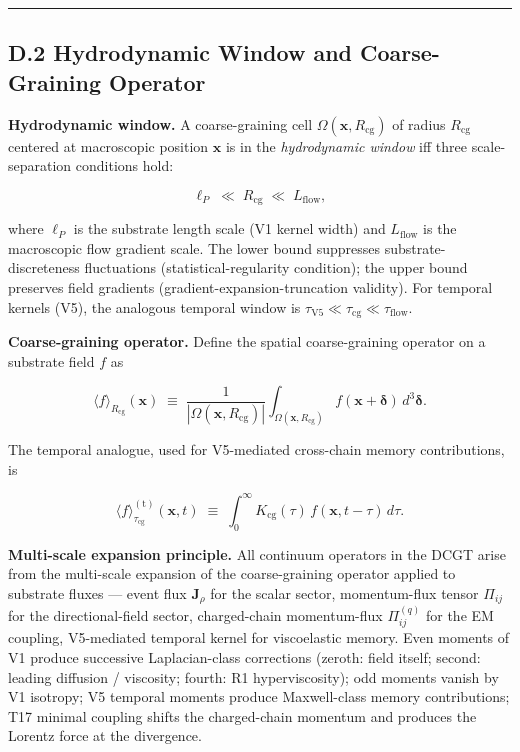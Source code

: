 \documentclass[
  11pt,a4paper]{article}
\begin{document}
\begin{center}\rule{0.5\linewidth}{0.5pt}\end{center}

\subsection{D.2 Hydrodynamic Window and Coarse-Graining
Operator}\label{d.2-hydrodynamic-window-and-coarse-graining-operator}

\textbf{Hydrodynamic window.} A coarse-graining cell
\(\Omega(\mathbf{x},R_\mathrm{cg})\) of radius \(R_\mathrm{cg}\)
centered at macroscopic position \(\mathbf{x}\) is in the
\emph{hydrodynamic window} iff three scale-separation conditions hold:

\[\ell_P \;\ll\; R_\mathrm{cg} \;\ll\; L_\mathrm{flow},\]

where \(\ell_P\) is the substrate length scale (V1 kernel width) and
\(L_\mathrm{flow}\) is the macroscopic flow gradient scale. The lower
bound suppresses substrate-discreteness fluctuations
(statistical-regularity condition); the upper bound preserves field
gradients (gradient-expansion-truncation validity). For temporal kernels
(V5), the analogous temporal window is
\(\tau_\mathrm{V5} \ll \tau_\mathrm{cg} \ll \tau_\mathrm{flow}\).

\textbf{Coarse-graining operator.} Define the spatial coarse-graining
operator on a substrate field \(f\) as

\[\langle f\rangle_{R_\mathrm{cg}}(\mathbf{x}) \;\equiv\; \frac{1}{|\Omega(\mathbf{x},R_\mathrm{cg})|}\int_{\Omega(\mathbf{x},R_\mathrm{cg})} f(\mathbf{x}+\boldsymbol{\delta})\,d^3\boldsymbol{\delta}.\]

The temporal analogue, used for V5-mediated cross-chain memory
contributions, is

\[\langle f\rangle^\mathrm{(t)}_{\tau_\mathrm{cg}}(\mathbf{x},t) \;\equiv\; \int_0^\infty K_\mathrm{cg}(\tau)\,f(\mathbf{x},t-\tau)\,d\tau.\]

\textbf{Multi-scale expansion principle.} All continuum operators in the
DCGT arise from the multi-scale expansion of the coarse-graining
operator applied to substrate fluxes --- event flux \(\mathbf{J}_\rho\)
for the scalar sector, momentum-flux tensor \(\Pi_{ij}\) for the
directional-field sector, charged-chain momentum-flux \(\Pi^{(q)}_{ij}\)
for the EM coupling, V5-mediated temporal kernel for viscoelastic
memory. Even moments of V1 produce successive Laplacian-class
corrections (zeroth: field itself; second: leading diffusion /
viscosity; fourth: R1 hyperviscosity); odd moments vanish by V1
isotropy; V5 temporal moments produce Maxwell-class memory
contributions; T17 minimal coupling shifts the charged-chain momentum
and produces the Lorentz force at the divergence.
\end{document}
